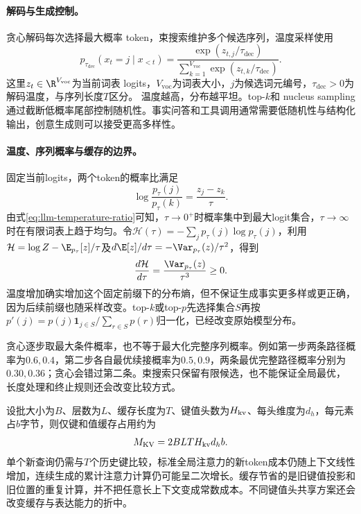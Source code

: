 \paragraph{解码与生成控制。}
贪心解码每次选择最大概率 token，束搜索维护多个候选序列，温度采样使用
\begin{equation}
 p_{\tau_{\mathrm{dec}}}(x_t=j\mid x_{<t})
 =\frac{\exp(z_{t,j}/\tau_{\mathrm{dec}})}{\sum_{k=1}^{V_{\mathrm{voc}}}\exp(z_{t,k}/\tau_{\mathrm{dec}})}.
\end{equation}
这里$z_t\in\R^{V_{\mathrm{voc}}}$为当前词表 logits，$V_{\mathrm{voc}}$为词表大小，$j$为候选词元编号，$\tau_{\mathrm{dec}}>0$为解码温度，与序列长度$T$区分。
温度越高，分布越平坦。top-$k$和 nucleus sampling 通过截断低概率尾部控制随机性。事实问答和工具调用通常需要低随机性与结构化输出，创意生成则可以接受更高多样性。

\paragraph{温度、序列概率与缓存的边界。}
固定当前logits，两个token的概率比满足
\begin{equation}
 \log\frac{p_\tau(j)}{p_\tau(k)}=\frac{z_j-z_k}{\tau}.\label{eq:llm-temperature-ratio}
\end{equation}
由式\eqref{eq:llm-temperature-ratio}可知，$\tau\to0^+$时概率集中到最大logit集合，$\tau\to\infty$时在有限词表上趋于均匀。令$\mathcal H(\tau)=-\sum_jp_\tau(j)\log p_\tau(j)$，利用$\mathcal H=\log Z-\E_{p_\tau}[z]/\tau$及$d\E[z]/d\tau=-\Var_{p_\tau}(z)/\tau^2$，得到
\begin{equation}
 \frac{d\mathcal H}{d\tau}=\frac{\Var_{p_\tau}(z)}{\tau^3}\geq0.
\end{equation}
温度增加确实增加这个固定前缀下的分布熵，但不保证生成事实更多样或更正确，因为后续前缀也随采样改变。top-$k$或top-$p$先选择集合$S$再按$p'(j)=p(j)\mathbf1_{j\in S}/\sum_{r\in S}p(r)$归一化，已经改变原始模型分布。

贪心逐步取最大条件概率，也不等于最大化完整序列概率。例如第一步两条路径概率为$0.6,0.4$，第二步各自最优续接概率为$0.5,0.9$，两条最优完整路径概率分别为$0.30,0.36$；贪心会错过第二条。束搜索只保留有限候选，也不能保证全局最优，长度处理和终止规则还会改变比较方式。

设批大小为$B$、层数为$L$、缓存长度为$T$、键值头数为$H_{\rm kv}$、每头维度为$d_h$，每元素占$b$字节，则仅键和值缓存占用约为
\begin{equation}
 M_{\rm KV}=2BLTH_{\rm kv}d_hb.
\end{equation}
单个新查询仍需与$T$个历史键比较，标准全局注意力的新token成本仍随上下文线性增加，连续生成的累计注意力计算仍可能呈二次增长。缓存节省的是旧键值投影和旧位置的重复计算，并不把任意长上下文变成常数成本。不同键值头共享方案还会改变缓存与表达能力的折中。

